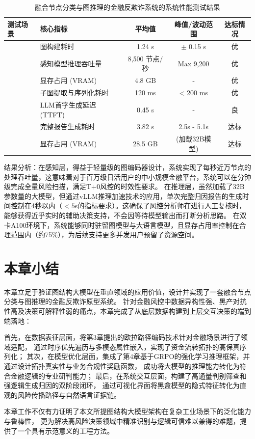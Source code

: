 \begin{table}[htbp]
    \centering
    \caption{融合节点分类与图推理的金融反欺诈系统的系统性能测试结果}
    \label{tab:performance_test}
    \renewcommand{\arraystretch}{1.2}
    \begin{tabular}{l l c c c}
        \toprule
        \textbf{测试场景} & \textbf{核心指标} & \textbf{平均值} & \textbf{峰值/波动范围} & \textbf{达标情况} \\
        \midrule
        & 图构建耗时 & 1.24 s & $\pm$ 0.15 s & 优 \\
        & 感知模型推理吞吐量 & 8,500 节点/秒 & Max 9,200 & 优 \\
        & 显存占用 (VRAM) & 4.8 GB & - & 优 \\
        \midrule
        & 子图提取与序列化耗时 & 120 ms & < 200 ms & 优 \\
        & LLM首字生成延迟 (TTFT) & 0.45 s & - & 良 \\
        & 完整报告生成耗时 & 3.82 s & 2.5s - 5.1s & 达标 \\
        & 显存占用 (VRAM) & 28.5 GB & (加载32B模型) & 达标 \\
        \bottomrule
    \end{tabular}
\end{table}

结果分析：在感知层，得益于轻量级的图编码器设计，系统实现了每秒近万节点的处理吞吐量，这意味着对于百万级日活用户的中小规模金融平台，系统可以在分钟级完成全量风险扫描，满足T+0风控的时效性要求。
在推理层，虽然加载了32B参数量的大模型，但通过vLLM推理加速技术的应用，单次完整归因报告的生成时间控制在4秒以内（$<5$s的指标要求）。这确保了风控分析师在进行人工复核时，能够获得近乎实时的辅助决策支持，不会因等待模型输出而打断分析思路。
在双卡A100环境下，系统能够同时驻留图模型与大语言模型，且显存占用率控制在合理范围内（约75\%），为后续支持更多并发用户预留了资源空间。


\section{本章小结}

本章立足于验证图结构大模型在垂直领域的应用价值，设计并实现了一套融合节点分类与图推理的金融反欺诈原型系统。 
针对金融风控中数据异构性强、黑产对抗性高及决策可解释性弱的痛点，本章完成了从底层数据构建到上层交互决策的端到端落地：

首先，在数据表征层面，将第3章提出的欧拉路径编码技术针对金融场景进行了领域适配，
通过时序优先遍历与多模态属性嵌入，实现了资金流转拓扑的高保真序列化； 
其次，在模型优化层面，集成了第4章基于GRPO的强化学习推理框架，并通过设计拓扑真实性与业务合规性奖励函数，
成功将大模型的推理能力转化为符合金融逻辑的专业研判能力； 
最后，在系统交互层面，构建了高通量判别筛查和强逻辑生成归因的双阶段闭环，
通过可视化界面将黑盒模型的隐式特征转化为直观的风险传播路径与自然语言证据链。

本章工作不仅有力证明了本文所提图结构大模型架构在复杂工业场景下的泛化能力与鲁棒性，
更为解决高风险决策领域中精准识别与逻辑可信难以兼得的难题，提供了一个具有示范意义的工程方法。